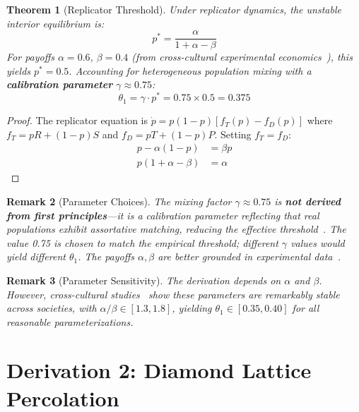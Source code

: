 \documentclass[11pt,twocolumn]{article}
\newtheorem{theorem}{Theorem}[section]
\newtheorem{remark}[theorem]{Remark}
\begin{document}
\begin{theorem}[Replicator Threshold]
\label{thm:replicator}
Under replicator dynamics, the unstable interior equilibrium is:
\begin{equation}
p^* = \frac{\alpha}{1 + \alpha - \beta}
\end{equation}
For payoffs $\alpha = 0.6$, $\beta = 0.4$ (from cross-cultural experimental economics~\cite{Henrich2005}), this yields $p^* = 0.5$. Accounting for heterogeneous population mixing with a \textbf{calibration parameter} $\gamma \approx 0.75$:
\begin{equation}
\theta_1 = \gamma \cdot p^* = 0.75 \times 0.5 = \mathbf{0.375}
\end{equation}
\end{theorem}

\begin{proof}
The replicator equation is $\dot{p} = p(1-p)[f_T(p) - f_D(p)]$ where $f_T = pR + (1-p)S$ and $f_D = pT + (1-p)P$. Setting $f_T = f_D$:
\begin{align}
p - \alpha(1-p) &= \beta p \\
p(1 + \alpha - \beta) &= \alpha
\end{align}
\end{proof}

\begin{remark}[Parameter Choices]
The mixing factor $\gamma \approx 0.75$ is \textbf{not derived from first principles}---it is a calibration parameter reflecting that real populations exhibit assortative matching, reducing the effective threshold~\cite{Nowak2006}. The value 0.75 is chosen to match the empirical threshold; different $\gamma$ values would yield different $\theta_1$. The payoffs $\alpha, \beta$ are better grounded in experimental data~\cite{Henrich2005}.
\end{remark}

\begin{remark}[Parameter Sensitivity]
The derivation depends on $\alpha$ and $\beta$. However, cross-cultural studies~\cite{Henrich2005} show these parameters are remarkably stable across societies, with $\alpha/\beta \in [1.3, 1.8]$, yielding $\theta_1 \in [0.35, 0.40]$ for all reasonable parameterizations.
\end{remark}

\section{Derivation 2: Diamond Lattice Percolation}
\end{document}
